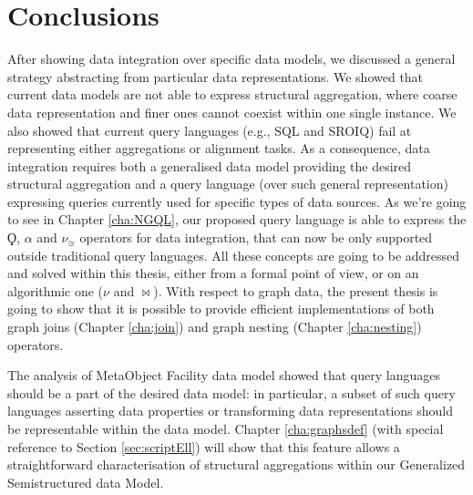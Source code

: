 \section{Conclusions}
After showing data integration over specific data models, we discussed a general strategy abstracting from particular data representations. We showed that current data models are not able to express structural aggregation, where coarse data representation and finer ones cannot coexist within one single instance. We also showed that current query languages (e.g., SQL and SROIQ) fail at representing either aggregations or alignment tasks. As a consequence, data integration requires both a generalised data model providing the desired structural aggregation and a query language (over such general representation) expressing queries currently used for specific types of data sources. As we're going to see in Chapter \ref{cha:NGQL}, our proposed query language is  able to express the $\Qoppa$, $\alpha$ and $\nu_\cong$ operators for data integration, that can now be only supported outside traditional query languages. All these concepts are going to be addressed and solved within this thesis, either from a formal point of view, or on an algorithmic one ($\nu$ and $\bowtie$). With respect to graph data, the present thesis is going to show that it is possible to provide efficient implementations of both graph joins (Chapter \ref{cha:join}) and graph nesting (Chapter \ref{cha:nesting}) operators.

The analysis of MetaObject Facility data model showed that query languages should be a part of the desired data model: in particular, a subset of such query languages asserting data properties or transforming data representations should be representable within the data model. Chapter \ref{cha:graphsdef} (with special reference to Section \vref{sec:scriptEll}) will show that this feature allows a straightforward characterisation of structural aggregations within our Generalized Semistructured data Model.
